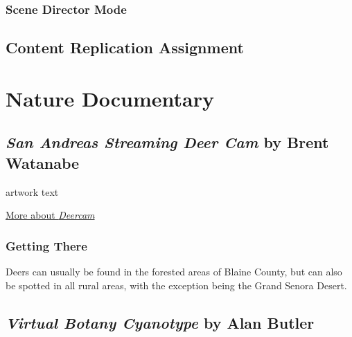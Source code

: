 \documentclass[
  openany]{book}
\begin{document}
\hypertarget{scene-director-mode}{%
\subsection*{Scene Director Mode}\label{scene-director-mode}}

\hypertarget{content-replication-assignment-2}{%
\section*{Content Replication Assignment}\label{content-replication-assignment-2}}

\hypertarget{nature-documentary}{%
\chapter{Nature Documentary}\label{nature-documentary}}

\hypertarget{san-andreas-streaming-deer-cam-by-brent-watanabe}{%
\section*{\texorpdfstring{\emph{San Andreas Streaming Deer Cam} by Brent Watanabe}{San Andreas Streaming Deer Cam by Brent Watanabe}}\label{san-andreas-streaming-deer-cam-by-brent-watanabe}}

artwork text

\href{https://bwatanabe.com/GTA_V_WanderingDeer.html}{More about \emph{Deercam}}

\hypertarget{getting-there-5}{%
\subsection*{Getting There}\label{getting-there-5}}

Deers can usually be found in the forested areas of Blaine County, but can also be spotted in all rural areas, with the exception being the Grand Senora Desert.

\hypertarget{virtual-botany-cyanotype-by-alan-butler}{%
\section*{\texorpdfstring{\emph{Virtual Botany Cyanotype} by Alan Butler}{Virtual Botany Cyanotype by Alan Butler}}\label{virtual-botany-cyanotype-by-alan-butler}}
\end{document}
